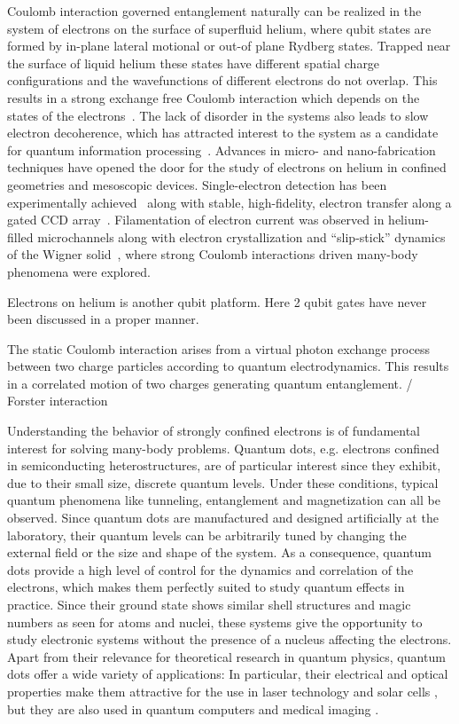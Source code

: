 \documentclass[twocolumn,superscriptaddress,unsortedaddress,
 amsmath,amssymb,
 aps,
]{revtex4-2}
\begin{document}
Coulomb interaction governed entanglement naturally can be realized in the system of electrons on the surface of superfluid helium, where qubit states are formed by in-plane lateral motional or out-of plane Rydberg states. Trapped near the surface of liquid helium these states have different spatial charge configurations and the wavefunctions of different electrons do not overlap. This results in a strong exchange free Coulomb interaction which depends on the states of the electrons~\cite{dykman2003qubits}. The lack of disorder in the systems also leads to slow electron decoherence, which has attracted interest to the system as a candidate for quantum information processing~\cite{platzman1999quantum,lyon2006spin,schuster2010proposal}. Advances in micro- and nano-fabrication techniques have opened the door for the study of electrons on helium in confined geometries and mesoscopic devices. Single-electron detection has been experimentally achieved~\cite{glasson2005trapping,koolstra2019coupling} along with stable, high-fidelity, electron transfer along a gated CCD array~\cite{bradbury2011efficient}. Filamentation of electron current was observed in helium-filled microchannels along with electron crystallization and ``slip-stick'' dynamics of the Wigner solid~\cite{glasson2001observation,rees2016structural,rees2016stick}, where strong Coulomb interactions driven many-body phenomena were explored.


Electrons on helium is another qubit platform. Here 2 qubit gates have never been discussed in a proper manner.

The static Coulomb interaction arises from a virtual photon exchange process between two charge particles according to quantum electrodynamics. This results in a correlated motion of two charges generating quantum entanglement.
 / Forster interaction

Understanding the behavior of strongly confined electrons is of fundamental
interest for solving many-body problems.  Quantum dots, e.g. electrons
confined in semiconducting heterostructures, are of particular interest since
they exhibit, due to their small size, discrete quantum levels.  Under these
conditions, typical quantum phenomena like tunneling, entanglement and
magnetization can all be observed.   Since quantum
dots are manufactured and designed artificially at the laboratory, their
quantum levels can be arbitrarily tuned by changing the external field or the
size and shape of the system.  As a consequence, quantum dots provide a high
level of control for the dynamics and correlation of the electrons, which
makes them perfectly suited to study quantum effects in practice.  Since their
ground state shows similar shell structures and magic numbers as seen for
atoms and nuclei, these systems give the opportunity to
study electronic systems without the presence of a nucleus affecting the
electrons.  Apart from their relevance for theoretical research in quantum
physics, quantum dots offer a wide variety of applications: In particular,
their electrical and optical properties make them attractive for the use in
laser technology \cite{strauf2010,5075760} and solar cells
\cite{jenks:013111,doi:10.1021/cr900289f}, but they are also used in quantum
computers\cite{PhysRevA.57.120} and medical imaging \cite{Ben-Ari02042003}.
\end{document}
